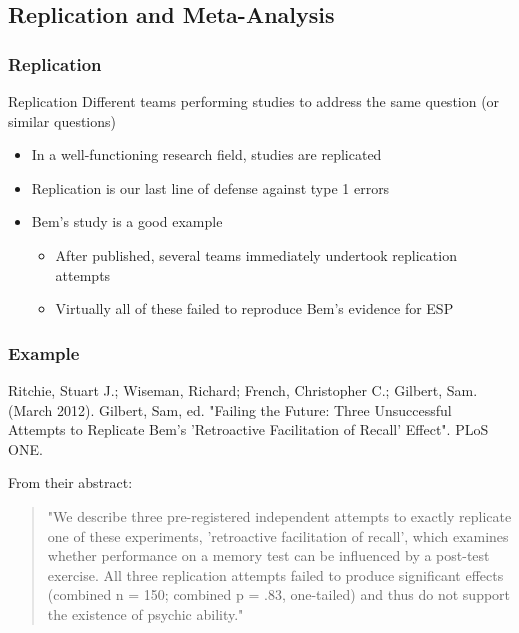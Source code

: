 \documentclass[10pt, block=fill]{beamer}
\begin{document}
\subsection{Replication and Meta-Analysis}

\begin{frame}
    \frametitle{Replication}
    
    \begin{block}{Replication}
        Different teams performing studies to address the same question (or similar questions)
    \end{block}
    
    \begin{itemize}
        \item In a well-functioning research field, studies are replicated
        \item Replication is our last line of defense against type 1 errors
        \item Bem's study is a good example
        \begin{itemize}
            \item After published, several teams immediately undertook replication attempts
            \item Virtually all of these failed to reproduce Bem's evidence for ESP
        \end{itemize}
    \end{itemize}
    
\end{frame}

\begin{frame}
    \frametitle{Example}
    
    Ritchie, Stuart J.; Wiseman, Richard; French, Christopher C.; Gilbert, Sam. (March 2012). Gilbert, Sam, ed. "Failing the Future: Three Unsuccessful Attempts to Replicate Bem's 'Retroactive Facilitation of Recall' Effect". PLoS ONE.
    
    \vspace{0.25in}
    
    From their abstract:
    \begin{quote}
        "We describe three pre-registered independent attempts to exactly replicate one of these experiments, 'retroactive facilitation of recall', which examines whether performance on a memory test can be influenced by a post-test exercise. All three replication attempts failed to produce significant effects (combined n = 150; combined p = .83, one-tailed) and thus do not support the existence of psychic ability."
    \end{quote}
    
\end{frame}
\end{document}

